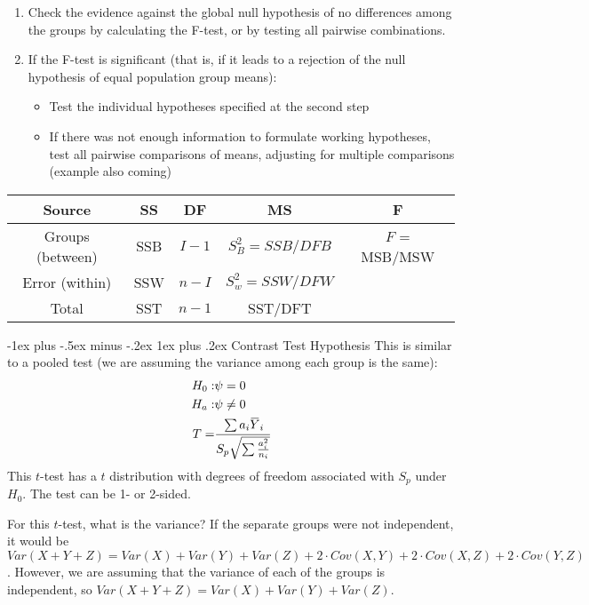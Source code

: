 \documentclass[10pt,landscape]{article}
\makeatletter
\renewcommand{\subsubsection}{\@startsection{subsubsection}{3}{0mm}%
                                {-1ex plus -.5ex minus -.2ex}%
                                {1ex plus .2ex}%
                                {\normalfont\small\bfseries}}
\newcommand{\overbar}[1]{\mkern 1.5mu\overline{\mkern-1.5mu#1\mkern-1.5mu}\mkern 1.5mu}
\makeatother
\begin{document}
\begin{multicols*}{3}
\begin{enumerate}
\item Check the evidence against the global null hypothesis of no
differences among the groups by calculating the F-test, or by testing all pairwise combinations. 
\item If the F-test is significant (that is, if it leads to a rejection of the
null hypothesis of equal population group means):
\begin{itemize}
\item Test the individual hypotheses specified at the second step
\item If there was not enough information to formulate working hypotheses, test all pairwise comparisons of means, adjusting for multiple comparisons (example also coming)
\end{itemize}
\end{enumerate}
\begin{tabular}{| c | c | c | c | c |}
\hline
Source & SS & DF & MS & F \\
\hline
Groups (between) & SSB & $I-1$ & $S^2_B = SSB/DFB$ & $F$ = MSB/MSW \\
Error (within) & SSW & $n-I$ & $S^2_w = SSW/DFW$ & \\
\hline
Total & SST & $n-1$ & SST/DFT & \\
\hline
\end{tabular}

\subsubsection{Contrast Test Hypothesis}
This is similar to a pooled test (we are assuming the variance among each group is the same):
\begin{align*}
H_0 :& \psi = 0 \\
H_a :& \psi \neq 0\\
T =& \cfrac{\sum a_i \overbar{Y}_i } {S_p \sqrt{\sum \frac{a_i^2}{n_i} } }\\
\end{align*}
This $t$-test has a $t$ distribution with degrees of freedom associated with $S_p$ under $H_0$. The 
test can be 1- or 2-sided.

For this $t$-test, what is the variance? If the separate groups were not independent, it would be
$Var(X+Y+Z) = Var(X) + Var(Y) + Var(Z) + 2\cdot Cov(X,Y) + 2\cdot Cov(X,Z) + 2\cdot Cov(Y,Z)$. 
However, we are assuming that the variance of each of the groups is independent, so 
$Var(X+ Y + Z) = Var(X) + Var(Y) + Var(Z)$.


\end{multicols*}
\end{document}
